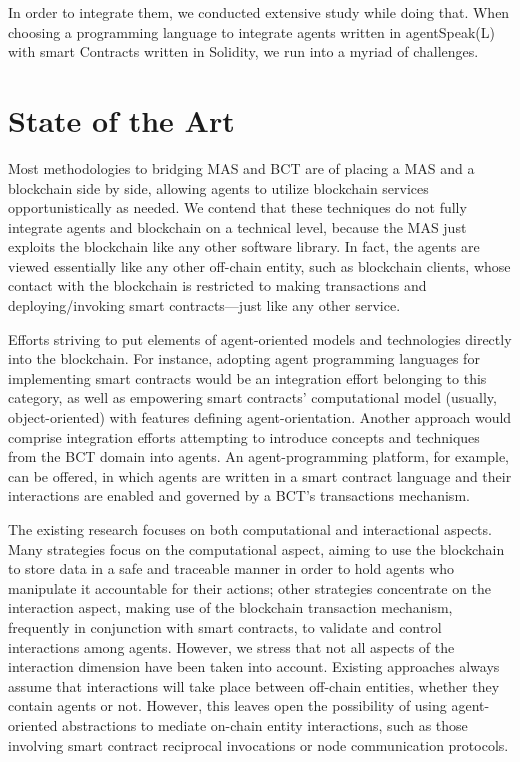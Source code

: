 In order to integrate them, we conducted extensive study while doing that. When choosing a programming language to integrate agents written in agentSpeak(L) with smart Contracts written in Solidity, we run into a myriad of challenges.

\section{State of the Art}

Most methodologies to bridging \ac{MAS} and \ac{BCT} are of placing a \ac{MAS} and a blockchain side by side, allowing agents to utilize blockchain services opportunistically as needed. We contend that these techniques do not fully integrate agents and blockchain on a technical level, because the \ac{MAS} just exploits the blockchain like any other software library. In fact, the agents are viewed essentially like any other off-chain entity, such as blockchain clients, whose contact with the blockchain is restricted to making transactions and deploying/invoking smart contracts—just like any other service.

\vspace{.5cm}

Efforts striving to put elements of agent-oriented models and technologies directly into the blockchain.
For instance, adopting agent programming languages for implementing smart contracts would be an
integration effort belonging to this category, as well as empowering smart contracts’ computational
model (usually, object-oriented) with features defining agent-orientation. Another approach would comprise integration efforts attempting to introduce concepts and techniques from the \ac{BCT} domain into agents. An agent-programming platform, for example, can be offered, in which agents are written in a smart contract language and their interactions are enabled and governed by a \ac{BCT}'s transactions mechanism.


\vspace{.5cm}

The existing research focuses on both computational and interactional aspects. Many strategies focus on the computational aspect, aiming to use the blockchain to store data in a safe and traceable manner in order to hold agents who manipulate it accountable for their actions; other strategies concentrate on the interaction aspect, making use of the blockchain transaction mechanism, frequently in conjunction with smart contracts, to validate and control interactions among agents. However, we stress that not all aspects of the interaction dimension have been taken into account. Existing approaches always assume that interactions will take place between off-chain entities, whether they contain agents or not. However, this leaves open the possibility of using agent-oriented abstractions to mediate on-chain entity interactions, such as those involving smart contract reciprocal invocations or node communication protocols.

